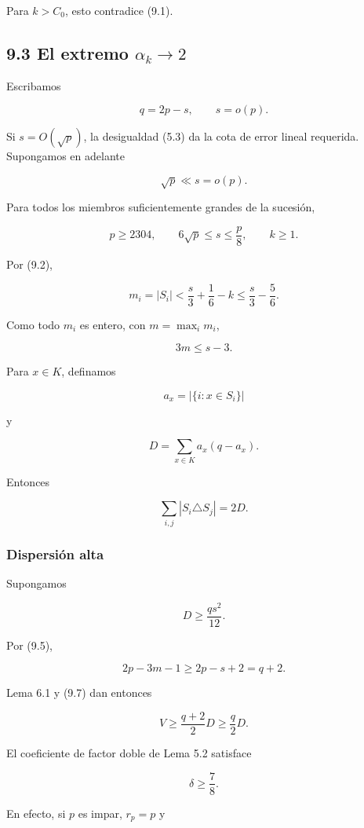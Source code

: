 \documentclass[
  11pt,
]{article}
\begin{document}
Para \(k>C_0\), esto contradice (9.1).

\subsection{\texorpdfstring{9.3 El extremo \(\alpha_k\to2\)}{9.3 El extremo \textbackslash alpha\_k\textbackslash to2}}\label{el-extremo-alpha_kto2}

Escribamos

\[
q=2p-s,
\qquad
s=o(p).
\]

Si \(s=O(\sqrt p)\), la desigualdad (5.3) da la cota de error lineal requerida. Supongamos en adelante

\[
\sqrt p\ll s=o(p).
\tag{9.3}
\]

Para todos los miembros suficientemente grandes de la sucesión,

\[
p\ge2304,
\qquad
6\sqrt p\le s\le\frac p8,
\qquad
k\ge1.
\tag{9.4}
\]

Por (9.2),

\[
m_i=|S_i|
<
\frac s3+\frac16-k
\le
\frac s3-\frac56.
\]

Como todo \(m_i\) es entero, con \(m=\max_i m_i\),

\[
\boxed{3m\le s-3.}
\tag{9.5}
\]

Para \(x\in K\), definamos

\[
a_x=|\{i:x\in S_i\}|
\]

y

\[
D=\sum_{x\in K}a_x(q-a_x).
\tag{9.6}
\]

Entonces

\[
\sum_{i,j}|S_i\triangle S_j|=2D.
\tag{9.7}
\]

\subsubsection{Dispersión alta}\label{dispersiuxf3n-alta}

Supongamos

\[
D\ge\frac{qs^2}{12}.
\tag{9.8}
\]

Por (9.5),

\[
2p-3m-1\ge2p-s+2=q+2.
\]

Lema 6.1 y (9.7) dan entonces

\[
V
\ge
\frac{q+2}{2}D
\ge
\frac q2D.
\tag{9.9}
\]

El coeficiente de factor doble de Lema 5.2 satisface

\[
\boxed{\delta\ge\frac78.}
\tag{9.10}
\]

En efecto, si \(p\) es impar, \(r_p=p\) y
\end{document}
